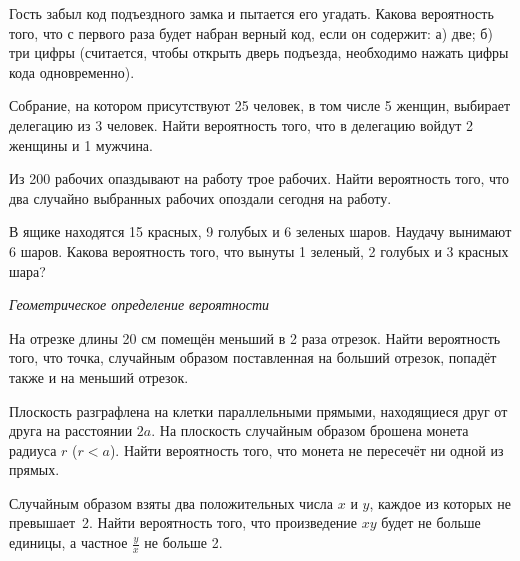 \documentclass[a4paper,14pt]{extarticle}
\begin{document}
\begin{enumerate}

\item 
Гость забыл код подъездного замка и пытается его угадать. Какова
вероятность того, что с первого раза будет набран верный код, если он
содержит: а) две; б) три цифры (считается, чтобы открыть дверь
подъезда, необходимо нажать цифры кода одновременно).




\item 
    Собрание, на котором присутствуют 25 человек, в том числе 5 женщин, выбирает делегацию из 3 человек. Найти вероятность того, что в делегацию войдут 2 женщины и 1 мужчина. 
\item Из 200 рабочих опаздывают на работу трое рабочих. Найти вероятность того, что два случайно выбранных рабочих опоздали сегодня на работу.
\item 
В ящике находятся 15 красных, 9 голубых и 6 зеленых шаров. Наудачу
вынимают 6 шаров. Какова вероятность того, что вынуты 1 зеленый, 2
голубых и 3 красных шара?

{\item[] \centering\itshape Геометрическое определение вероятности\par}
\item 
На отрезке длины 20 см помещён меньший в 2 раза отрезок. Найти
вероят\-ность того, что точка, случайным образом поставленная на
больший отрезок, попадёт также и на меньший отрезок. 
\item 
Плоскость разграфлена на клетки параллельными прямыми, находящиеся друг от друга
на расстоянии $2a$. На плоскость случайным образом брошена
монета радиуса $r$ ($r<a$). Найти вероятность того, что монета не пересечёт ни одной из прямых.

\item 
Случайным образом взяты два положительных числа $x$ и $y$, каждое из кото\-рых не превышает~2. 
Найти вероятность того, что произведение $xy$ будет не больше единицы, а частное  ${\frac{y}{x}}$ не больше 2.


\end{enumerate}
\end{document}
